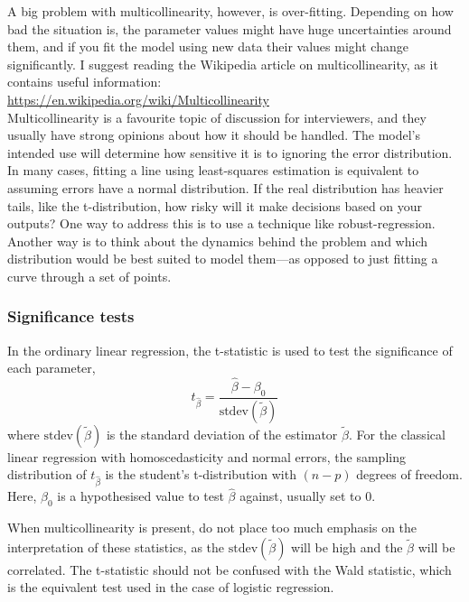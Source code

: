 \documentclass[a4paper]{article}
\begin{document}
\begin{description}
  A big problem with multicollinearity, however, is over-fitting.
  Depending on how bad the situation is, the parameter values might have huge uncertainties around them, and if you fit the model using new data their values might change significantly.
  I suggest reading the Wikipedia article on multicollinearity, as it contains useful information: \\
  \url{https://en.wikipedia.org/wiki/Multicollinearity} \\
  Multicollinearity is a favourite topic of discussion for interviewers, and they usually have strong opinions about how it should be handled.
  The model's intended use will determine how sensitive it is to ignoring the error distribution.
  In many cases, fitting a line using least-squares estimation is equivalent to assuming errors have a normal distribution.
  If the real distribution has heavier tails, like the t-distribution, how risky will it make decisions based on your outputs?
  One way to address this is to use a technique like robust-regression.
  Another way is to think about the dynamics behind the problem and which distribution would be best suited to model them---as opposed to just fitting a curve through a set of points.
\end{description}

\subsubsection{Significance tests}
In the ordinary linear regression, the t-statistic is used to test the significance of each parameter,
\[
t_{\hat\beta}  =  \frac{\hat\beta - \beta_0}{ \text{stdev}( \tilde\beta) }
\]
where
${\text{stdev}( \tilde\beta)}$
is the standard deviation of the estimator
$\tilde\beta$.
For the classical linear regression with homoscedasticity and normal errors,
the sampling distribution of
$t_{\hat\beta}$
is the student's t-distribution with $(n-p)$ degrees of freedom.
Here, $\beta_0$ is a hypothesised value to test $\hat\beta$ against, usually set to $0$.

When multicollinearity is present, do not place too much emphasis on the interpretation of these statistics, as the  $\text{stdev}( \tilde\beta) $ will be high and the $\tilde\beta$ will be correlated. The t-statistic should not be confused with the Wald statistic, which is the equivalent test used in the case of logistic regression.
\end{document}
